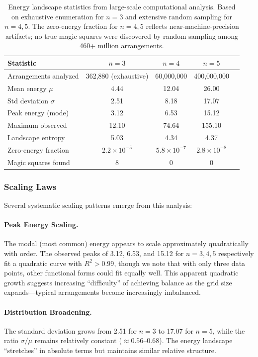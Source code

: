 \begin{table}[H]
\centering
\begin{tabular}{lcccc}
\toprule
Statistic & $n = 3$ & $n = 4$ & $n = 5$ \\
\midrule
Arrangements analyzed & 362,880 (exhaustive) & 60,000,000 & 400,000,000 \\
Mean energy $\mu$ & 4.44 & 12.04 & 26.00 \\
Std deviation $\sigma$ & 2.51 & 8.18 & 17.07 \\
Peak energy (mode) & 3.12 & 6.53 & 15.12 \\
Maximum observed & 12.10 & 74.64 & 155.10 \\
Landscape entropy & 5.03 & 4.34 & 4.37 \\
Zero-energy fraction & $2.2 \times 10^{-5}$ & $5.8 \times 10^{-7}$ & $2.8 \times 10^{-8}$ \\
Magic squares found & 8 & 0 & 0 \\
\bottomrule
\end{tabular}
\caption{Energy landscape statistics from large-scale computational analysis.
Based on exhaustive enumeration for $n=3$ and extensive random sampling for $n=4,5$.
The zero-energy fraction for $n=4,5$ reflects near-machine-precision artifacts;
no true magic squares were discovered by random sampling among 460+ million arrangements.}
\label{tab:landscape_stats}
\end{table}

\subsubsection{Scaling Laws}

Several systematic scaling patterns emerge from this analysis:

\paragraph{Peak Energy Scaling.}
The modal (most common) energy appears to scale approximately quadratically with order.
The observed peaks of 3.12, 6.53, and 15.12 for $n=3,4,5$ respectively
fit a quadratic curve with $R^2 > 0.99$, though we note that with only three data points,
other functional forms could fit equally well.
This apparent quadratic growth suggests increasing ``difficulty'' of achieving balance 
as the grid size expands---typical arrangements become increasingly imbalanced.

\paragraph{Distribution Broadening.}
The standard deviation grows from 2.51 for $n=3$ to 17.07 for $n=5$,
while the ratio $\sigma/\mu$ remains relatively constant ($\approx 0.56$--$0.68$).
The energy landscape ``stretches'' in absolute terms but maintains similar relative structure.

